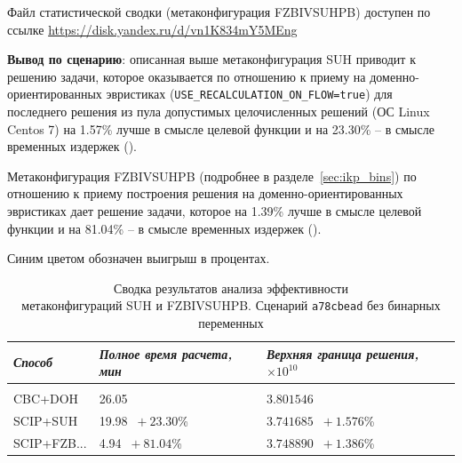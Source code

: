 \documentclass[%
	11pt,
	a4paper,
	utf8,
		]{article}
\begin{document}
Файл статистической сводки (метаконфигурация FZBIVSUHPB) доступен по ссылке \url{https://disk.yandex.ru/d/vn1K834mY5MEng}

\vspace*{3mm}
\textbf{Вывод по сценарию}: описанная выше метаконфигурация SUH приводит к решению задачи, которое оказывается по отношению к приему на доменно-ориентированных эвристиках (\verb|USE_RECALCULATION_ON_FLOW=true|) для последнего решения из пула допустимых целочисленных решений (ОС Linux Centos 7) на 1.57\% лучше в смысле целевой функции и на 23.30\% -- в смысле временных издержек ().

Метаконфигурация FZBIVSUHPB (подробнее в разделе~\ref{sec:ikp_bins}) по отношению к приему построения решения на доменно-ориентированных эвристиках дает решение задачи, которое на 1.39\% лучше в смысле целевой функции и на  81.04\% -- в смысле временных издержек ().

Синим цветом обозначен выигрыш в процентах.

{
	\begin{table}[!h]
		\centering
		\caption{Сводка результатов анализа эффективности \\метаконфигураций SUH и FZBIVSUHPB. Сценарий \texttt{a78cbead} без бинарных переменных}
		\begin{tabular}{ p{2.5cm} p{3.3cm} p{3.4cm} }
			\emph{Способ} & \emph{Полное время расчета, мин} & \emph{Верхняя граница решения, $ \times 10^{10} $} \\
			\hline\hline\\[-3.5mm]
			{CBC+DOH} & 26.05& $ 3.801546 $ \\
			\hline
			SCIP+SUH & 19.98 {\color{blue} $\ +23.30 $\%} & $ 3.741685 $ {\color{blue} $\ +1.576 $\%} \\
			\hline
			SCIP+FZB... & 4.94 {\color{blue} $\ +81.04 $\%} & $ 3.748890 $ {\color{blue} $\ +1.386 $\%} \\
		\end{tabular}\label{tab:a78cbead_wo_bins}
	\end{table}
}
\end{document}
